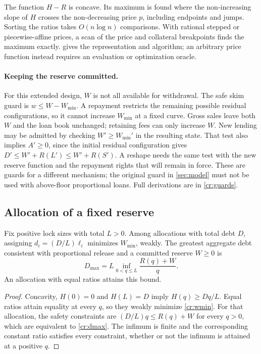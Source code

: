 The function $H-R$ is concave. Its maximum is found where the non-increasing slope of $H$ crosses the non-decreasing price $p$, including endpoints and jumps. Sorting the ratios takes $O(n\log n)$ comparisons. With rational stepped or piecewise-affine prices, a scan of the price and collateral breakpoints finds the maximum exactly.  gives the representation and algorithm; an arbitrary price function instead requires an evaluation or optimization oracle.

\paragraph{Keeping the reserve committed.}
For this extended design, $W$ is not all available for withdrawal. The safe skim guard is $w\le W-W_{\min}$. A repayment restricts the remaining possible residual configurations, so it cannot increase $W_{\min}$ at a fixed curve. Gross sales leave both $W$ and the loan book unchanged; retaining fees can only increase $W$. New lending may be admitted by checking $W'\ge W_{\min}'$ in the resulting state. That test also implies $A'\ge0$, since the initial residual configuration gives $D'\le W'+R(L')\le W'+R(S')$. A reshape needs the same test with the new reserve function and the repayment rights that will remain in force. These are guards for a different mechanism; the original  guard in \cref{sec:model} must not be used with above-floor proportional loans. Full derivations are in \cref{cr:guards}.

\subsection{Allocation of a fixed reserve}\label{cr:allocation}

\begin{proposition}\label{cr:capacity}
Fix positive lock sizes with total $L>0$. Among allocations with total debt $D$, assigning $d_i=(D/L)\ell_i$ minimizes $W_{\min}$, weakly. The greatest aggregate debt consistent with proportional release and a committed reserve $W\ge0$ is
\begin{equation}\label{cr:dmax}
D_{\max}=L\inf_{0<q\le L}\frac{R(q)+W}{q}.
\end{equation}
An allocation with equal ratios attains this bound.
\end{proposition}
\begin{proof}
Concavity, $H(0)=0$ and $H(L)=D$ imply $H(q)\ge Dq/L$. Equal ratios attain equality at every $q$, so they weakly minimize \eqref{cr:wmin}. For that allocation, the safety constraints are $(D/L)q\le R(q)+W$ for every $q>0$, which are equivalent to \eqref{cr:dmax}. The infimum is finite and the corresponding constant ratio satisfies every constraint, whether or not the infimum is attained at a positive $q$.
\end{proof}

